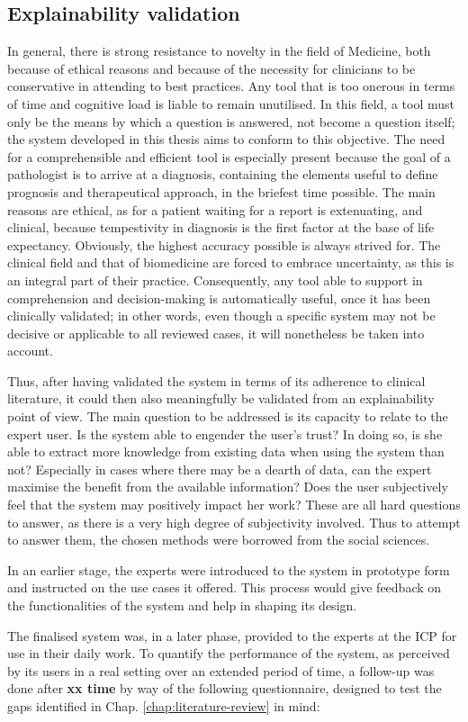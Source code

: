 
\subsection{Explainability validation} \label{subsec:explainability-validation}
In general, there is strong resistance to novelty in the field of Medicine, both because of ethical reasons and because of the necessity for clinicians to be conservative in attending to best practices.
Any tool that is too onerous in terms of time and cognitive load is liable to remain unutilised.
In this field, a tool must only be the means by which a question is answered, not become a question itself; the system developed in this thesis aims to conform to this objective.
The need for a comprehensible and efficient tool is especially present because the goal of a pathologist is to arrive at a diagnosis, containing the elements useful to define prognosis and therapeutical approach, in the briefest time possible.
The main reasons are ethical, as for a patient waiting for a report is extenuating, and clinical, because tempestivity in diagnosis is the first factor at the base of life expectancy.
Obviously, the highest accuracy possible is always strived for.
The clinical field and that of biomedicine are forced to embrace uncertainty, as this is an integral part of their practice.
Consequently, any tool able to support in comprehension and decision-making is automatically useful, once it has been clinically validated; in other words, even though a specific system may not be decisive or applicable to all reviewed cases, it will nonetheless be taken into account.

Thus, after having validated the system in terms of its adherence to clinical literature, it could then also meaningfully be validated from an explainability point of view.
The main question to be addressed is its capacity to relate to the expert user.
Is the system able to engender the user's trust?
In doing so, is she able to extract more knowledge from existing data when using the system than not?
Especially in cases where there may be a dearth of data, can the expert maximise the benefit from the available information?
Does the user subjectively feel that the system may positively impact her work?
These are all hard questions to answer, as there is a very high degree of subjectivity involved.
Thus to attempt to answer them, the chosen methods were borrowed from the social sciences.

In an earlier stage, the experts were introduced to the system in prototype form and instructed on the use cases it offered.
This process would give feedback on the functionalities of the system and help in shaping its design.

The finalised system was, in a later phase, provided to the experts at the ICP for use in their daily work.
To quantify the performance of the system, as perceived by its users in a real setting over an extended period of time, a follow-up was done after \textbf{xx time} by way of the following questionnaire, designed to test the gaps identified in Chap. \ref{chap:literature-review} in mind:


